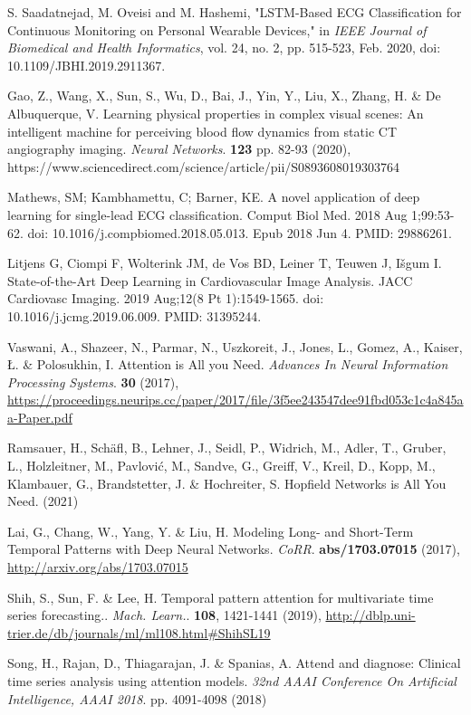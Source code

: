 \documentclass{ieeeaccess}
\begin{document}
\begin{thebibliography}{1}
S. Saadatnejad, M. Oveisi and M. Hashemi, "LSTM-Based ECG Classification for Continuous Monitoring on Personal Wearable Devices," in {\em IEEE Journal of Biomedical and Health Informatics}, vol. 24, no. 2, pp. 515-523, Feb. 2020, doi: 10.1109/JBHI.2019.2911367.

Gao, Z., Wang, X., Sun, S., Wu, D., Bai, J., Yin, Y., Liu, X., Zhang, H. \& De Albuquerque, V. Learning physical properties in complex visual scenes: An intelligent machine for perceiving blood flow dynamics from static CT angiography imaging. {\em Neural Networks}. \textbf{123} pp. 82-93 (2020), https://www.sciencedirect.com/science/article/pii/S0893608019303764

Mathews, SM; Kambhamettu, C; Barner, KE. A novel application of deep learning for single-lead ECG classification. Comput Biol Med. 2018 Aug 1;99:53-62. doi: 10.1016/j.compbiomed.2018.05.013. Epub 2018 Jun 4. PMID: 29886261.

Litjens G, Ciompi F, Wolterink JM, de Vos BD, Leiner T, Teuwen J, Išgum I. State-of-the-Art Deep Learning in Cardiovascular Image Analysis. JACC Cardiovasc Imaging. 2019 Aug;12(8 Pt 1):1549-1565. doi: 10.1016/j.jcmg.2019.06.009. PMID: 31395244.

Vaswani, A., Shazeer, N., Parmar, N., Uszkoreit, J., Jones, L., Gomez, A., Kaiser, Ł. \& Polosukhin, I. Attention is All you Need. {\em Advances In Neural Information Processing Systems}. \textbf{30} (2017), \url{https://proceedings.neurips.cc/paper/2017/file/3f5ee243547dee91fbd053c1c4a845aa-Paper.pdf}

Ramsauer, H., Schäfl, B., Lehner, J., Seidl, P., Widrich, M., Adler, T., Gruber, L., Holzleitner, M., Pavlović, M., Sandve, G., Greiff, V., Kreil, D., Kopp, M., Klambauer, G., Brandstetter, J. \& Hochreiter, S. Hopfield Networks is All You Need.  (2021)

Lai, G., Chang, W., Yang, Y. \& Liu, H. Modeling Long- and Short-Term Temporal Patterns with Deep Neural Networks. {\em CoRR}. \textbf{abs/1703.07015} (2017), \url{http://arxiv.org/abs/1703.07015}

Shih, S., Sun, F. \& Lee, H. Temporal pattern attention for multivariate time series forecasting.. {\em Mach. Learn.}. \textbf{108}, 1421-1441 (2019), \url{http://dblp.uni-trier.de/db/journals/ml/ml108.html#ShihSL19}


Song, H., Rajan, D., Thiagarajan, J. \& Spanias, A. Attend and diagnose: Clinical time series analysis using attention models. {\em 32nd AAAI Conference On Artificial Intelligence, AAAI 2018}. pp. 4091-4098 (2018)


\end{thebibliography}
\end{document}
